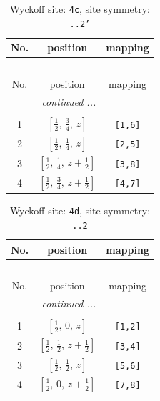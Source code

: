 \documentclass[fleqn,8pt]{jsarticle}
\begin{document}
\renewcommand{\arraystretch}{1.2}
\begin{longtable}{ccc}
\caption{Wyckoff site: {\tt 4c}, site symmetry: {\tt ..2'}}
 \\
 \hline \hline
No. & position & mapping \\ \hline \endfirsthead

\multicolumn{2}{l}{\tablename\ \thetable{}} \\
 \hline \hline
No. & position & mapping \\ \hline \endhead

 \hline \hline
\multicolumn{2}{r}{\footnotesize\it continued ...} \\ \endfoot

 \hline \hline
\multicolumn{2}{r}{} \\ \endlastfoot

1 & $\left[ \frac{1}{2},\, \frac{3}{4},\, z \right]$ & {\tt [1,6]} \\ \hline
2 & $\left[ \frac{1}{2},\, \frac{1}{4},\, z \right]$ & {\tt [2,5]} \\ \hline
3 & $\left[ \frac{1}{2},\, \frac{1}{4},\, z + \frac{1}{2} \right]$ & {\tt [3,8]} \\ \hline
4 & $\left[ \frac{1}{2},\, \frac{3}{4},\, z + \frac{1}{2} \right]$ & {\tt [4,7]} \\
\end{longtable}
\renewcommand{\arraystretch}{1.2}
\begin{longtable}{ccc}
\caption{Wyckoff site: {\tt 4d}, site symmetry: {\tt ..2}}
 \\
 \hline \hline
No. & position & mapping \\ \hline \endfirsthead

\multicolumn{2}{l}{\tablename\ \thetable{}} \\
 \hline \hline
No. & position & mapping \\ \hline \endhead

 \hline \hline
\multicolumn{2}{r}{\footnotesize\it continued ...} \\ \endfoot

 \hline \hline
\multicolumn{2}{r}{} \\ \endlastfoot

1 & $\left[ \frac{1}{2},\, 0,\, z \right]$ & {\tt [1,2]} \\ \hline
2 & $\left[ \frac{1}{2},\, \frac{1}{2},\, z + \frac{1}{2} \right]$ & {\tt [3,4]} \\ \hline
3 & $\left[ \frac{1}{2},\, \frac{1}{2},\, z \right]$ & {\tt [5,6]} \\ \hline
4 & $\left[ \frac{1}{2},\, 0,\, z + \frac{1}{2} \right]$ & {\tt [7,8]} \\
\end{longtable}
\end{document}
